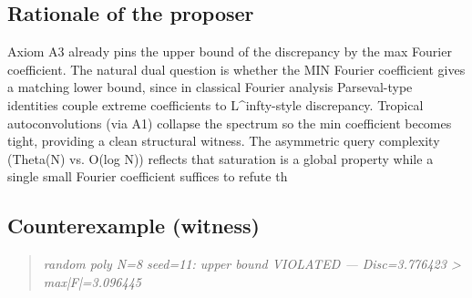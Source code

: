 \documentclass[11pt,a4paper]{article}
\begin{document}
\subsection*{Rationale of the proposer}
Axiom A3 already pins the upper bound of the discrepancy by the max Fourier coefficient. The natural dual question is whether the MIN Fourier coefficient gives a matching lower bound, since in classical Fourier analysis Parseval-type identities couple extreme coefficients to L\textasciicircum{}infty-style discrepancy. Tropical autoconvolutions (via A1) collapse the spectrum so the min coefficient becomes tight, providing a clean structural witness. The asymmetric query complexity (Theta(N) vs. O(log N)) reflects that saturation is a global property while a single small Fourier coefficient suffices to refute th

\subsection*{Counterexample (witness)}
\begin{quote}\itshape
random poly N=8 seed=11: upper bound VIOLATED — Disc=3.776423 > max|F|=3.096445
\end{quote}
\end{document}
